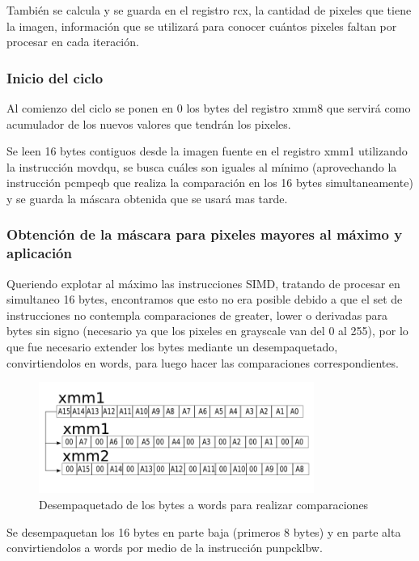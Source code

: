 También se calcula y se guarda en el registro rcx, la cantidad de pixeles que tiene la imagen, información que se utilizará para conocer cuántos pixeles faltan por procesar en cada iteración.

\subsubsection{Inicio del ciclo}
Al comienzo del ciclo se ponen en 0 los bytes del registro xmm8 que servirá como acumulador de los nuevos valores que tendrán los pixeles.

Se leen 16 bytes contiguos desde la imagen fuente en el registro xmm1 utilizando la instrucción movdqu, se busca cuáles son iguales al mínimo (aprovechando la instrucción pcmpeqb que realiza la comparación en los 16 bytes simultaneamente) y se guarda la máscara obtenida que se usará mas tarde.

\subsubsection{Obtención de la máscara para pixeles mayores al máximo y aplicación}

Queriendo explotar al máximo las instrucciones SIMD, tratando de procesar en simultaneo 16 bytes, encontramos que esto no era posible debido a que el set de instrucciones no contempla comparaciones de greater, lower o derivadas para bytes sin signo (necesario ya que los pixeles en grayscale van del 0 al 255), por lo que fue necesario extender los bytes mediante un desempaquetado, convirtiendolos en words, para luego hacer las comparaciones correspondientes.

\begin{figure}[H]
\centering
\includegraphics[width=90mm]{unpackxmm1.png}
\caption{Desempaquetado de los bytes a words para realizar comparaciones}
\label{overflow}
\end{figure}
Se desempaquetan los 16 bytes en parte baja (primeros 8 bytes) y en parte alta convirtiendolos a words por medio de la instrucción punpcklbw.

